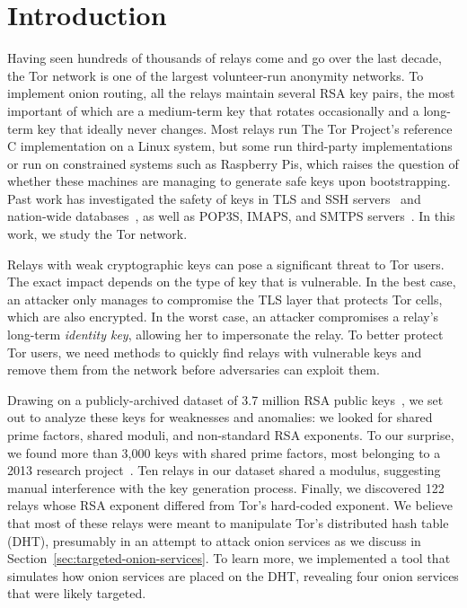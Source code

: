 \section{Introduction}
Having seen hundreds of thousands of relays come and go over the last decade,
the Tor network is one of the largest volunteer-run anonymity networks.  To
implement onion routing, all the relays maintain several RSA key pairs, 
the most important of which are a medium-term key that rotates occasionally 
and a long-term key that ideally never changes.  
Most relays run The Tor Project's reference C
implementation on a Linux system, but some run third-party implementations or 
run on constrained systems such as Raspberry Pis, which 
raises the question of whether these machines are managing to generate 
safe keys upon bootstrapping.  Past work has investigated the safety of
keys in TLS and SSH servers~\cite{Heninger2012a} and  
nation-wide databases~\cite{Bernstein2013a}, as well as POP3S, IMAPS, and SMTPS
servers~\cite{Hastings2016a}.  In this work, we study the Tor network.

Relays with weak cryptographic keys can pose a significant threat to Tor users.
The exact impact depends on the type of key that is vulnerable.  In the best
case, an attacker only manages to compromise the TLS layer that protects Tor
cells, which are also encrypted.  In the worst case, an attacker compromises a
relay's long-term \emph{identity key}, allowing her to impersonate the relay.
To better protect Tor users, we need methods to quickly find relays with
vulnerable keys and remove them from the network before adversaries can exploit
them.

Drawing on a publicly-archived dataset of 3.7 million RSA public
keys~\cite{collector}, we set out to analyze these keys for weaknesses and
anomalies: we looked for shared prime factors, shared moduli, 
and non-standard RSA exponents.
To our surprise, we found more than 3,000 keys with shared prime factors, most
belonging to a 2013 research project~\cite{Biryukov2013a}.  Ten relays in
our dataset shared a modulus, suggesting manual interference with the key
generation process.  Finally, we discovered 122 relays whose RSA exponent
differed from Tor's hard-coded exponent.  We believe that most of these relays
were meant to manipulate Tor's distributed hash table (DHT), presumably in an
attempt to attack onion services as we discuss in
Section~\ref{sec:targeted-onion-services}.  To learn more, we implemented a
tool that simulates how onion services are placed on the DHT, revealing four
onion services that were likely targeted.  

